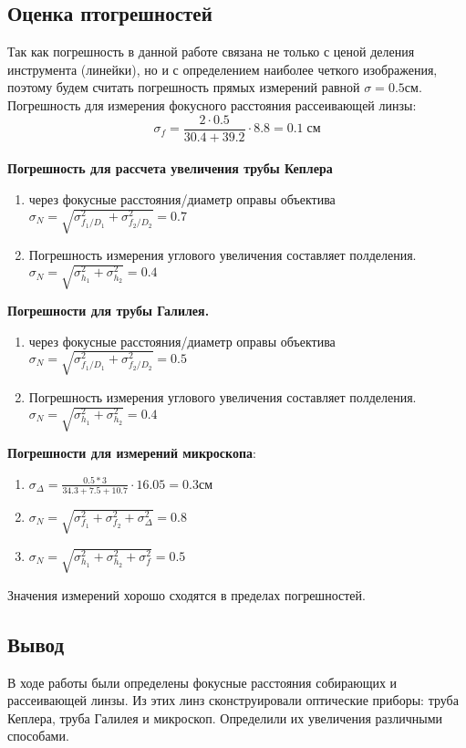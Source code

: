 \documentclass[12pt,a4paper]{article}
\begin{document}
\subsection{Оценка птогрешностей}

Так как погрешность в данной работе связана не только с ценой деления инструмента (линейки), но и с определением наиболее четкого изображения, поэтому будем считать погрешность прямых измерений равной $\sigma = 0.5 см$.
\\ 
Погрешность для измерения фокусного расстояния рассеивающей линзы:
\begin{equation}
    \sigma_f = \frac{2\cdot0.5}{30.4+39.2}\cdot 8.8 = 0.1 \; см
\end{equation}
\\
\textbf{Погрешность для рассчета увеличения трубы Кеплера}
\begin{enumerate}
    \item через фокусные расстояния/диаметр оправы объектива
    $\sigma_N = \sqrt{\sigma^2_{f_1/D_1}+\sigma^2_{f_2/D_2}} = 0.7$
    \item Погрешность измерения углового увеличения составляет полделения.
    $\sigma_N = \sqrt{\sigma^2_{h_1}+\sigma^2_{h_2}} = 0.4$
\end{enumerate}
\par

\textbf{Погрешности для трубы Галилея.}
\begin{enumerate}
    \item через фокусные расстояния/диаметр оправы объектива
    $\sigma_N = \sqrt{\sigma^2_{f_1/D_1}+\sigma^2_{f_2/D_2}} = 0.5$
    \item Погрешность измерения углового увеличения составляет полделения.
    $\sigma_N = \sqrt{\sigma^2_{h_1}+\sigma^2_{h_2}} = 0.4$
\end{enumerate}
    \par

\textbf{Погрешности для измерений микроскопа}:
\begin{enumerate}
    \item     $\sigma_\varDelta = \frac{0.5*3}{34.3+7.5+10.7} \cdot 16.05 = 0.3 см$
    \item $\sigma_N = \sqrt{\sigma^2_{f_1}+\sigma^2_{f_2}+\sigma^2_\varDelta} = 0.8$
    \item $\sigma_N = \sqrt{\sigma^2_{h_1}+\sigma^2_{h_2}+\sigma^2_f} = 0.5$
\end{enumerate}

Значения измерений хорошо сходятся в пределах погрешностей.
\subsection{Вывод}
В ходе работы были определены фокусные расстояния собирающих и рассеивающей линзы. Из этих линз сконструировали оптические приборы: труба Кеплера, труба Галилея и микроскоп. 
Определили их увеличения различными способами.
\newpage
\end{document}
